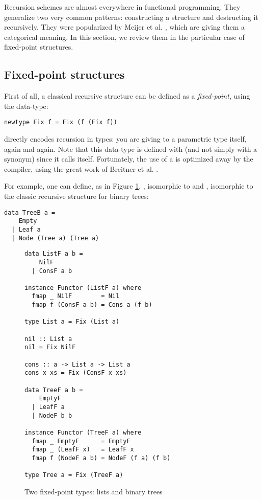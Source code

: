 
Recursion schemes are almost everywhere in functional programming. They generalize two very common patterns: constructing a structure and destructing it recursively. They were popularized by Meijer et al. \cite{4cec4a43c86444479dc0003182424795}, which are giving them a categorical meaning. In this section, we review them in the particular case of fixed-point structures.

\subsection{Fixed-point structures}
\label{subsec:defi}
First of all, a classical recursive structure can be defined as a \emph{fixed-point}, using the  data-type:
\begin{verbatim}
newtype Fix f = Fix (f (Fix f))
\end{verbatim}
 directly encodes recursion in types: you are giving to a parametric type itself, again and again. Note that this data-type is defined with  (and not simply with a  synonym) since it calls itself. Fortunately, the use of a  is optimized away by the compiler, using the great work of Breitner et al. \cite{Breitner:2014:SZC:2692915.2628141}.

For example, one can define, as in Figure \ref{fig:listtree},
, isomorphic to \hs{[a]} and , isomorphic to the classic recursive structure for binary trees:
\begin{verbatim}
data TreeB a =
    Empty
  | Leaf a
  | Node (Tree a) (Tree a)
\end{verbatim}

\begin{figure}
\begin{verbatim}
data ListF a b =
    NilF
  | ConsF a b

instance Functor (ListF a) where
  fmap _ NilF        = Nil
  fmap f (ConsF a b) = Cons a (f b)

type List a = Fix (List a)

nil :: List a
nil = Fix NilF

cons :: a -> List a -> List a
cons x xs = Fix (ConsF x xs)

data TreeF a b =
    EmptyF
  | LeafF a
  | NodeF b b

instance Functor (TreeF a) where
  fmap _ EmptyF      = EmptyF
  fmap _ (LeafF x)   = LeafF x
  fmap f (NodeF a b) = NodeF (f a) (f b)

type Tree a = Fix (TreeF a)
\end{verbatim}
\caption{Two fixed-point types: lists and binary trees}
\label{fig:listtree}
\end{figure}

